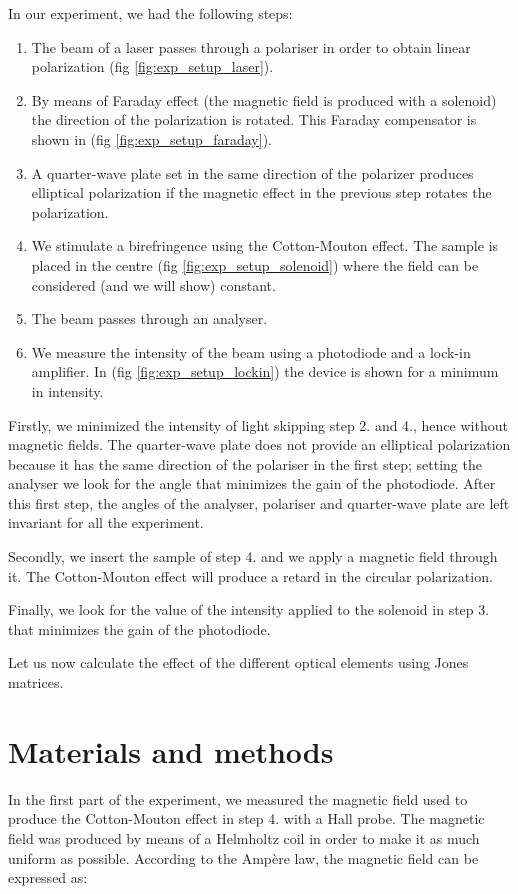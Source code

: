 \documentclass[11pt,a4paper]{article}
\begin{document}
In our experiment, we had the following steps:

\begin{enumerate}
\item The beam of a laser passes through a polariser in order to obtain linear polarization (fig \ref{fig:exp_setup_laser}).
\item By means of Faraday effect (the magnetic field is produced with a solenoid) the direction of the polarization is rotated. This Faraday compensator is shown in (fig \ref{fig:exp_setup_faraday}).
\item A quarter-wave plate set in the same direction of the polarizer produces elliptical polarization if the magnetic effect in the previous step rotates the polarization.
\item We stimulate a birefringence using the Cotton-Mouton effect. The sample is placed in the centre (fig \ref{fig:exp_setup_solenoid}) where the field can be considered (and we will show) constant.
\item The beam passes through an analyser.
\item We measure the intensity of the beam using a photodiode and a lock-in amplifier. In (fig \ref{fig:exp_setup_lockin}) the device is shown for a minimum in intensity.
\end{enumerate}	

Firstly, we minimized the intensity of light skipping step 2. and 4., hence without magnetic fields.  The quarter-wave plate does not provide an elliptical polarization because it has the same direction of the polariser in the first step; setting the analyser we look for the angle that minimizes the gain of the photodiode. After this first step, the angles of the analyser, polariser and quarter-wave plate are left invariant for all the experiment.

Secondly, we insert the sample of step 4. and we apply a magnetic field through it. The Cotton-Mouton effect will produce a retard in the circular polarization. 

Finally, we look for the value of the intensity applied to the solenoid in step 3. that minimizes the gain of the photodiode. 

Let us now calculate the effect of the different optical elements using Jones matrices.

\section{Materials and methods}\label{mm}
In the first part of the experiment, we measured the magnetic field used to produce the Cotton-Mouton effect in step 4. with a Hall probe. The magnetic field was produced by means of a Helmholtz coil in order to make it as much uniform as possible. According to the Ampère law, the magnetic field can be expressed as:
\end{document}
